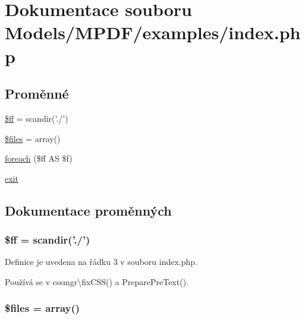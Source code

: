 \hypertarget{_models_2_m_p_d_f_2examples_2index_8php}{\section{Dokumentace souboru Models/\-M\-P\-D\-F/examples/index.php}
\label{_models_2_m_p_d_f_2examples_2index_8php}
}
\subsection*{Proměnné}
\begin{DoxyCompactItemize}
\item 
\hyperlink{_models_2_m_p_d_f_2examples_2index_8php_a064fd64c462dd929cd17812cf14ec09e}{\$ff} = scandir('./')
\item 
\hyperlink{_models_2_m_p_d_f_2examples_2index_8php_a9590b15215a21e9b42eb546aeef79704}{\$files} = array()
\item 
\hyperlink{_models_2_m_p_d_f_2examples_2index_8php_a4513c5246bc0181377066688733758e2}{foreach} (\$ff A\-S \$f)
\item 
\hyperlink{_models_2_m_p_d_f_2examples_2index_8php_a6733eb5f605d09eaede9845835d71c4e}{exit}
\end{DoxyCompactItemize}


\subsection{Dokumentace proměnných}
\hypertarget{_models_2_m_p_d_f_2examples_2index_8php_a064fd64c462dd929cd17812cf14ec09e}{
\subsubsection[{\$ff}]{\setlength{\rightskip}{0pt plus 5cm}\$ff = scandir('./')}}\label{_models_2_m_p_d_f_2examples_2index_8php_a064fd64c462dd929cd17812cf14ec09e}


Definice je uvedena na řádku 3 v souboru index.\-php.



Používá se v cssmgr\textbackslash{}fix\-C\-S\-S() a Prepare\-Pre\-Text().

\hypertarget{_models_2_m_p_d_f_2examples_2index_8php_a9590b15215a21e9b42eb546aeef79704}{
\subsubsection[{\$files}]{\setlength{\rightskip}{0pt plus 5cm}\$files = array()}}\label{_models_2_m_p_d_f_2examples_2index_8php_a9590b15215a21e9b42eb546aeef79704}


